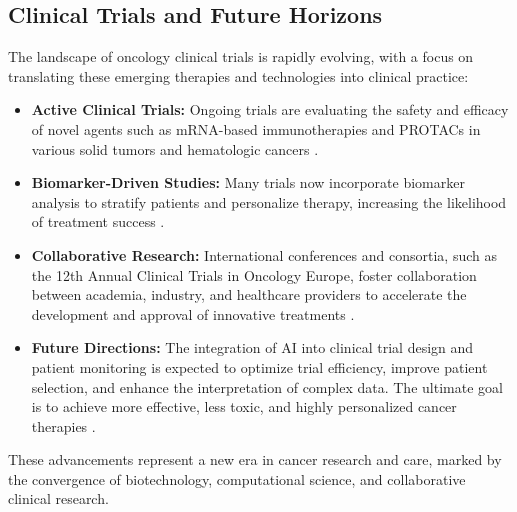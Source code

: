 \subsection{Clinical Trials and Future Horizons}

The landscape of oncology clinical trials is rapidly evolving, with a focus on translating these 
emerging therapies and technologies into clinical practice:

\begin{itemize}
    \item \textbf{Active Clinical Trials:} Ongoing trials are evaluating the safety and efficacy of 
    novel agents such as mRNA-based immunotherapies and PROTACs in various solid tumors and 
    hematologic cancers \cite{aiEarlyDetection2025, aiOncology2025}.
    
    \item \textbf{Biomarker-Driven Studies:} Many trials now incorporate biomarker analysis to 
    stratify patients and personalize therapy, increasing the likelihood of treatment success 
    \cite{therapeuticCancerVaccines2025}.
    
    \item \textbf{Collaborative Research:} International conferences and consortia, such as the 12th 
    Annual Clinical Trials in Oncology Europe, foster collaboration between academia, industry, and 
    healthcare providers to accelerate the development and approval of innovative treatments 
    \cite{geneEditingTherapy2025}.
    
    \item \textbf{Future Directions:} The integration of AI into clinical trial design and patient 
    monitoring is expected to optimize trial efficiency, improve patient selection, and enhance the 
    interpretation of complex data. The ultimate goal is to achieve more effective, less toxic, and 
    highly personalized cancer therapies \cite{clinicalTrialsEurope2025, nlmCitingMedicine2007}.
\end{itemize}

These advancements represent a new era in cancer research and care, marked by the 
convergence of biotechnology, computational science, and collaborative clinical research.
